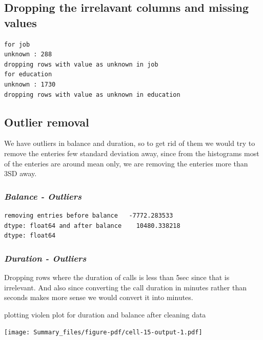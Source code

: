 \documentclass[
  letterpaper,
  DIV=11,
  numbers=noendperiod]{scrartcl}
\begin{document}
\hypertarget{dropping-the-irrelavant-columns-and-missing-values}{%
\subsection{Dropping the irrelavant columns and missing
values}\label{dropping-the-irrelavant-columns-and-missing-values}}

\begin{verbatim}
for job
unknown : 288
dropping rows with value as unknown in job
for education
unknown : 1730
dropping rows with value as unknown in education
\end{verbatim}

\hypertarget{outlier-removal}{%
\subsection{Outlier removal}\label{outlier-removal}}

We have outliers in balance and duration, so to get rid of them we would
try to remove the enteries few standard deviation away, since from the
histograms most of the enteries are around mean only, we are removing
the enteries more than 3SD away.

\hypertarget{balance---outliers}{%
\subsubsection{\texorpdfstring{\emph{Balance -
Outliers}}{Balance - Outliers}}\label{balance---outliers}}

\begin{verbatim}
removing entries before balance   -7772.283533
dtype: float64 and after balance    10480.338218
dtype: float64
\end{verbatim}

\hypertarget{duration---outliers}{%
\subsubsection{\texorpdfstring{\emph{Duration -
Outliers}}{Duration - Outliers}}\label{duration---outliers}}

Dropping rows where the duration of calls is less than 5sec since that
is irrelevant. And also since converting the call duration in minutes
rather than seconds makes more sense we would convert it into minutes.

plotting violen plot for duration and balance after cleaning data

\texttt{[image: Summary\_files/figure-pdf/cell-15-output-1.pdf]}
\end{document}
